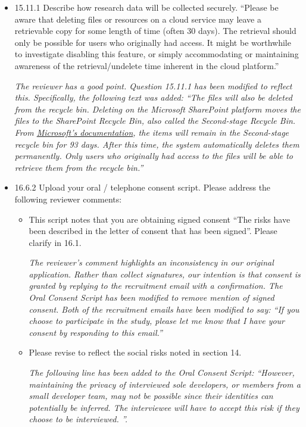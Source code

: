 \documentclass[12pt]{casletter}
\begin{document}
\begin{letter}
\begin{itemize}
\item 15.11.1 Describe how research data will be collected securely. ``Please
be aware that deleting files or resources on a cloud service may leave a
retrievable copy for some length of time (often 30 days). The retrieval should
only be possible for users who originally had access. It might be worthwhile to
investigate disabling this feature, or simply accommodating or maintaining
awareness of the retrieval/undelete time inherent in the cloud platform.''
\medskip

\emph{The reviewer has a good point.  Question 15.11.1 has been modified to
reflect this.  Specifically, the following text was added: ``The files will also
be deleted from the recycle bin.  Deleting on the Microsoft SharePoint platform
moves the files to the SharePoint Recycle Bin, also called the Second-stage
Recycle Bin.  From
\href{https://support.microsoft.com/en-us/office/restore-deleted-items-from-the-site-collection-recycle-bin-5fa924ee-16d7-487b-9a0a-021b9062d14b}{Microsoft's
documentation}, the items will remain in the Second-stage recycle bin for 93
days. After this time, the system automatically deletes them permanently.  Only
users who originally had access to the files will be able to retrieve them from
the recycle bin.''} \smallskip
\smallskip

\item 16.6.2 Upload your oral / telephone consent script.  Please address the
following reviewer comments: 

\begin{itemize} 
  
\item This script notes that you are obtaining signed consent ``The risks have
been described in the letter of consent that has been signed''. Please clarify in
16.1. \smallskip

\emph{The reviewer's comment highlights an inconsistency in our original
application. Rather than collect signatures, our intention is that consent is
granted by replying to the recruitment email with a confirmation.  The Oral
Consent Script has been modified to remove mention of signed consent.  Both of
the recruitment emails have been modified to say: ``If you choose to participate
in the study, please let me know that I have your consent by responding to this
email.'' } \smallskip

\item Please revise to reflect the social risks noted in section 14. \smallskip

\emph{The following line has been added to the Oral Consent Script: ``However,
maintaining the privacy of interviewed sole developers, or members from a small
developer team, may not be possible since their identities can potentially be
inferred. The interviewee will have to accept this risk if they choose to be
interviewed. ''.} \smallskip


\end{itemize}
\end{itemize}
\end{letter}
\end{document}
